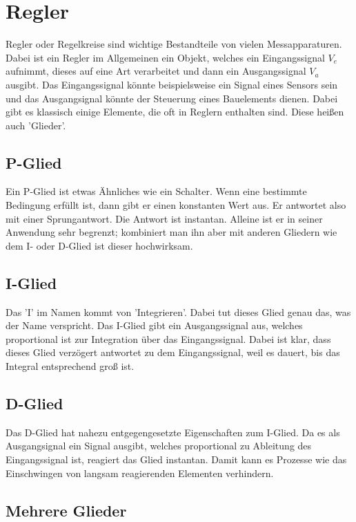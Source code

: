 \section{Regler}

Regler oder Regelkreise sind wichtige Bestandteile von vielen Messapparaturen. Dabei ist ein Regler im Allgemeinen ein Objekt, welches 
ein Eingangssignal $V_e$ aufnimmt, dieses auf eine Art verarbeitet und dann ein Ausgangssignal $V_a$ ausgibt. Das Eingangssignal könnte 
beispielsweise ein Signal eines Sensors sein und das Ausgangsignal könnte der Steuerung eines Bauelements dienen. Dabei gibt es klassisch einige Elemente, die 
oft in Reglern enthalten sind. Diese heißen auch 'Glieder'.

\subsection*{P-Glied}

Ein P-Glied ist etwas Ähnliches wie ein Schalter. Wenn eine bestimmte Bedingung erfüllt ist, dann gibt er einen konstanten Wert aus. Er antwortet also mit einer 
Sprungantwort. Die Antwort ist instantan. Alleine ist er in seiner Anwendung sehr begrenzt; kombiniert man ihn aber mit anderen Gliedern wie dem I- oder D-Glied ist dieser hochwirksam.

\subsection*{I-Glied}

Das 'I' im Namen kommt von 'Integrieren'. Dabei tut dieses Glied genau das, was der Name verspricht. Das I-Glied gibt ein Ausgangssignal aus, welches 
proportional ist zur Integration über das Eingangssignal. Dabei ist klar, dass dieses Glied verzögert antwortet zu dem Eingangssignal, weil 
es dauert, bis das Integral entsprechend groß ist.

\subsection*{D-Glied}

Das D-Glied hat nahezu entgegengesetzte Eigenschaften zum I-Glied. Da es als Ausgangsignal ein Signal ausgibt, welches proportional zu Ableitung des 
Eingangssignal ist, reagiert das Glied instantan. Damit kann es Prozesse wie das Einschwingen von langsam reagierenden Elementen verhindern.

\subsection*{Mehrere Glieder}

